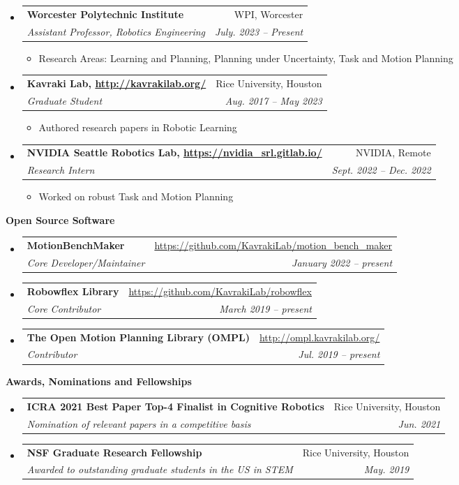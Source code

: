 \documentclass[letterpaper,11pt]{article}
\makeatletter
\newcommand{\resitem}[1]{\item #1 \vspace{-2pt}}
\newcommand{\resheading}[1]{{\large \colorbox{mygrey}{\begin{minipage}{\textwidth}{\textbf{#1 \vphantom{p\^{E}}}}\end{minipage}}}}
\newcommand{\ressubheading}[4]{
\begin{tabular*}{7.0in}{l@{\extracolsep{\fill}}r}
		\textbf{#1} & #2 \\
		\textit{#3} & \textit{#4} \\
\end{tabular*}\vspace{-6pt}}
\makeatother
\begin{document}
\begin{itemize}
	\item
	\ressubheading{Worcester Polytechnic Institute}{WPI, Worcester}
	{Assistant Professor, Robotics Engineering}{July. 2023 -- Present}
	\begin{itemize}
		\resitem{Research Areas: Learning and Planning, Planning under Uncertainty, Task and Motion Planning}
	\end{itemize}
	
    \item
        \ressubheading{Kavraki Lab, \url{http://kavrakilab.org/}}
	{Rice University, Houston}{Graduate Student}
	{Aug. 2017 -- May 2023  }
	\begin{itemize}
		\resitem{Authored research papers in Robotic Learning}
	\end{itemize}
\item
\ressubheading{NVIDIA Seattle Robotics Lab, \url{https://nvidia_srl.gitlab.io/}}
{NVIDIA, Remote}{Research Intern}
{Sept. 2022 -- Dec. 2022}
   \begin{itemize}
   \resitem{Worked on robust Task and Motion Planning}
   \end{itemize}
\end{itemize}
\resheading{Open Source Software}
\begin{itemize}
	\item \ressubheading{MotionBenchMaker}
	{\url{https://github.com/KavrakiLab/motion_bench_maker}}{Core Developer/Maintainer}{January 2022 -- present}
	\item \ressubheading{Robowflex Library}
	{\url{https://github.com/KavrakiLab/robowflex}}{Core Contributor}{March 2019 -- present}
	\item \ressubheading{The Open Motion Planning Library (OMPL)}
	{\url{http://ompl.kavrakilab.org/}}{Contributor}{Jul. 2019 -- present}
\end{itemize}	

\resheading{Awards, Nominations and Fellowships}
\begin{itemize}
	\item
	\ressubheading{ICRA 2021 Best Paper Top-4 Finalist in Cognitive Robotics}
	{Rice University, Houston}{Nomination of relevant papers in a competitive basis}
	{Jun. 2021}
	\item
	\ressubheading{NSF Graduate Research Fellowship}
	{Rice University, Houston}{Awarded to outstanding graduate students in the US in STEM }{May. 2019}
\end{itemize}
\end{document}
